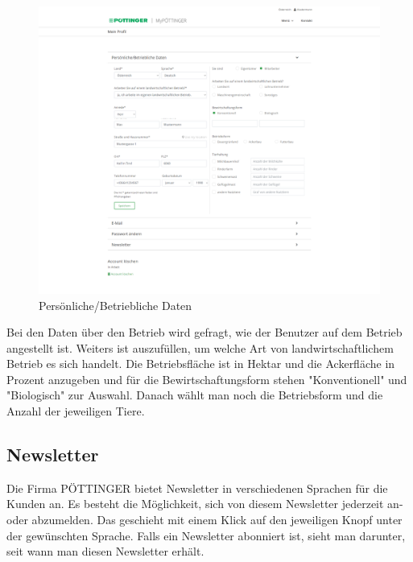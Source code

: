 \begin{figure}[H]
	\centerline{
		\includegraphics[width=1\textwidth, frame]{./grafiken/erm_profil_daten.png}
	}
	\vskip0pt
	\caption{Persönliche/Betriebliche Daten} \label{fig:profilData}
\end{figure}

Bei den Daten über den Betrieb wird gefragt, wie der Benutzer auf dem Betrieb angestellt ist. Weiters ist auszufüllen, um welche Art von landwirtschaftlichem Betrieb es sich handelt. Die Betriebsfläche ist in Hektar und die Ackerfläche in Prozent anzugeben und für die Bewirtschaftungsform stehen "Konventionell" und "Biologisch" zur Auswahl. Danach wählt man noch die Betriebsform und die Anzahl der jeweiligen Tiere.

\subsection{Newsletter}

Die Firma PÖTTINGER bietet Newsletter in verschiedenen Sprachen für die Kunden an. Es besteht die Möglichkeit, sich von diesem Newsletter jederzeit an- oder abzumelden. Das geschieht mit einem Klick auf den jeweiligen Knopf unter der gewünschten Sprache. Falls ein Newsletter abonniert ist, sieht man darunter, seit wann man diesen Newsletter erhält.

